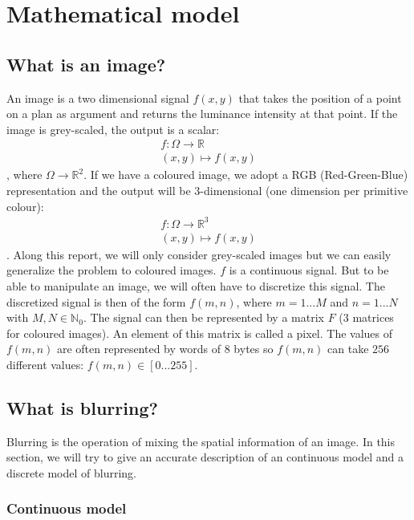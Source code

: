 \chapter{Mathematical model}

\section{What is an image?}

An image is a two dimensional signal $f(x,y)$ that takes the position of a point on a plan as argument and returns the luminance intensity at that point. If the image is grey-scaled, the output is a scalar:
\begin{eqnarray}
f:\Omega \rightarrow \mathbb{R} \\
(x,y) \mapsto f(x,y)
\end{eqnarray},
where $\Omega \rightarrow \mathbb{R}^2$. If we have a coloured image, we adopt a RGB (Red-Green-Blue) representation and the output will be 3-dimensional (one dimension per primitive colour):
\begin{eqnarray}
f:\Omega \rightarrow \mathbb{R}^3 \\
(x,y) \mapsto f(x,y)
\end{eqnarray}.
Along this report, we will only consider grey-scaled images but we can easily generalize the problem to coloured images. $f$ is a continuous signal. But to be able to manipulate an image, we will often have to discretize this signal. The discretized signal is then of the form $f(m,n)$, where $m=1...M$ and $n=1...N$ with $M,N \in \mathbb{N}_0$. The signal can then be represented by a matrix $F$ (3 matrices for coloured images). An element  of this matrix is called a pixel. The values of $f(m,n)$ are often represented by words of $8$ bytes so $f(m,n)$ can take $256$ different values: $f(m,n) \in \left[0...255\right]$.

\section{What is blurring?}

Blurring is the operation of mixing the spatial information of an image. In this section, we will try to give an accurate description of an continuous model and a discrete model of blurring.

\subsection{Continuous model}

